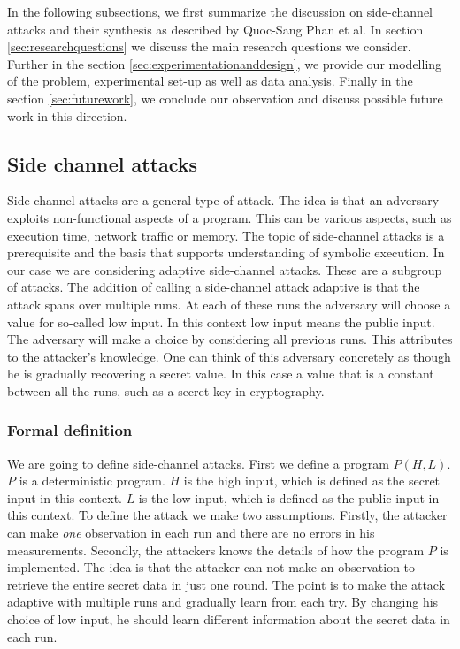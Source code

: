 \documentclass[11pt,a4paper,notitlepage]{article}
\begin{document}
In the following subsections, we first summarize the discussion on side-channel attacks and their synthesis as described by Quoc-Sang Phan et al. In section \ref{sec:researchquestions} we discuss the main research questions we consider.
Further in the section \ref{sec:experimentationanddesign}, we provide our modelling of the problem, experimental set-up as well as data analysis.
Finally in the section \ref{sec:futurework}, we conclude our observation and discuss possible future work in this direction.
\subsection{Side channel attacks}
\label{sec:sidechannelattacks}

Side-channel attacks are a general type of attack. The idea is that an adversary exploits non-functional aspects of a program. This can be various aspects, such as execution time, network traffic or memory. The topic of side-channel attacks is a prerequisite and the basis that supports understanding of symbolic execution. In our case we are considering adaptive side-channel attacks. These are a subgroup of attacks. The addition of calling a side-channel attack adaptive is that the attack spans over multiple runs. At each of these runs the adversary will choose a value for so-called low input. In this context low input means the public input. The adversary will make a choice by considering all previous runs. This attributes to the attacker's knowledge. One can think of this adversary concretely as though he is gradually recovering a secret value. In this case a value that is a constant between all the runs, such as a secret key in cryptography. 

\subsubsection{Formal definition}

We are going to define side-channel attacks. First we define a program $P(H,L)$. $P$ is a deterministic program. $H$ is the high input, which is defined as the secret input in this context. $L$ is the low input, which is defined as the public input in this context. To define the attack we make two assumptions. Firstly, the attacker can make \textit{one} observation in each run and there are no errors in his measurements. Secondly, the attackers knows the details of how the program $P$ is implemented. The idea is that the attacker can not make an observation to retrieve the entire secret data in just one round. The point is to make the attack adaptive with multiple runs and gradually learn from each try. By changing his choice of low input, he should learn different information about the secret data in each run. 
\end{document}
